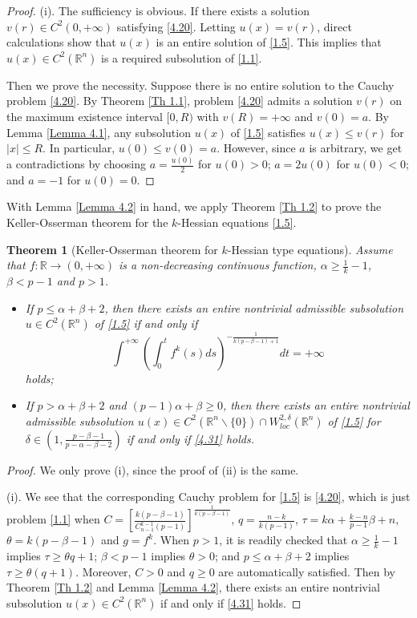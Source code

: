 \documentclass[a4paper,11pt]{amsart}
\theoremstyle{plain}
\newtheorem{Theorem}{Theorem}[section]
\theoremstyle{remark}
\numberwithin{equation}{section}
\numberwithin{figure}{section}
\numberwithin{remark}{section}
\begin{document}
\begin{sloppypar}
\begin{proof}
(i). The sufficiency is obvious. If there exists a solution $v(r)\in C^2(0,+\infty)$ satisfying \eqref{4.20}.
Letting $u(x)=v(r)$, direct calculations show that $u(x)$ is an entire solution of \eqref{1.5}. This implies that $u(x)\in C^2(\mathbb{R}^n)$ is a required subsolution of \eqref{1.1}.

Then we prove the necessity.
Suppose there is no entire solution to the Cauchy problem \eqref{4.20}. By Theorem \ref{Th 1.1}, problem \eqref{4.20} admits a solution $v(r)$ on the maximum existence interval $[0,R)$ with $v(R)= +\infty$  and $v(0)=a$.
By Lemma \ref{Lemma 4.1}, any subsolution $u(x)$ of  \eqref{1.5} satisfies $u(x)\leq v(r)$ for $|x|\leq R$. 	
In particular, $u(0)\leq v(0)=a$.
However, since $a$ is arbitrary, we get a contradictions by choosing
$a = \frac{u(0)}{2}$ for $u(0)>0$;
$a = 2u(0)$ for $u(0)<0$;
and $a =-1$ for $u(0)=0$.
\end{proof}

With Lemma \ref{Lemma 4.2} in hand, we apply Theorem \ref{Th 1.2} to prove the Keller-Osserman theorem for the $k$-Hessian equations \eqref{1.5}.
\begin{Theorem}[Keller-Osserman theorem for $k$-Hessian type equations]\label{Th 4.1}
Assume that $f: \mathbb{R} \to (0,+\infty)$ is a non-decreasing continuous function, $\alpha\ge \frac{1}{k}-1$, $\beta<p-1$ and $p>1$. 
\begin{itemize}
\item[(i).] If $p\le \alpha+\beta +2$, then there exists an entire nontrivial admissible subsolution $u\in C^2(\mathbb{R}^n)$ of \eqref{1.5} if and only if 
\begin{equation}\label{4.31}
\int^{+\infty} \left (\int_0^t f^k(s) ds \right )^{-\frac{1}{k(p-\beta -1)+1}} dt= + \infty
\end{equation}
holds;
\item[(ii).] If $p>\alpha+\beta +2$ and $(p-1)\alpha +\beta \ge 0$, then there exists an entire nontrivial admissible subsolution $u(x)\in C^2(\mathbb{R}^n\backslash \{0\})\cap  W_{loc}^{2,\delta}(\mathbb{R}^n)$ of \eqref{1.5} for $\delta \in (1, \frac{p-\beta-1}{p-\alpha-\beta-2})$ if and only if \eqref{4.31} holds.
\end{itemize}
\end{Theorem}
\begin{proof}
We only prove (i), since the proof of (ii) is the same.

(i). We see that the corresponding Cauchy problem for \eqref{1.5} is \eqref{4.20}, which is just problem \eqref{1.1} when $C=\left[ \frac{k(p-\beta-1)}{C_{n-1}^{k-1}(p-1)} \right]^{\frac{1}{k(p-\beta-1)}}$, $q=\frac{n-k}{k(p-1)}$, $\tau =k\alpha+\frac{k-n}{p-1}\beta+n$, $\theta =k(p-\beta-1)$ and $g=f^k$.
When $p>1$, it is readily checked that $\alpha\ge \frac{1}{k}-1$ implies $\tau \ge \theta q +1$; $\beta < p-1$ implies $\theta >0$; and $p\le \alpha + \beta +2$ implies $\tau \ge \theta(q+1)$. Moreover, $C>0$ and $q\ge 0$ are automatically satisfied. Then by Theorem \ref{Th 1.2} and Lemma \ref{Lemma 4.2}, there exists an entire nontrivial subsolution $u(x)\in C^2 (\mathbb{R}^n)$ if and only if \eqref{4.31} holds.
\end{proof}



\end{sloppypar}
\end{document}

